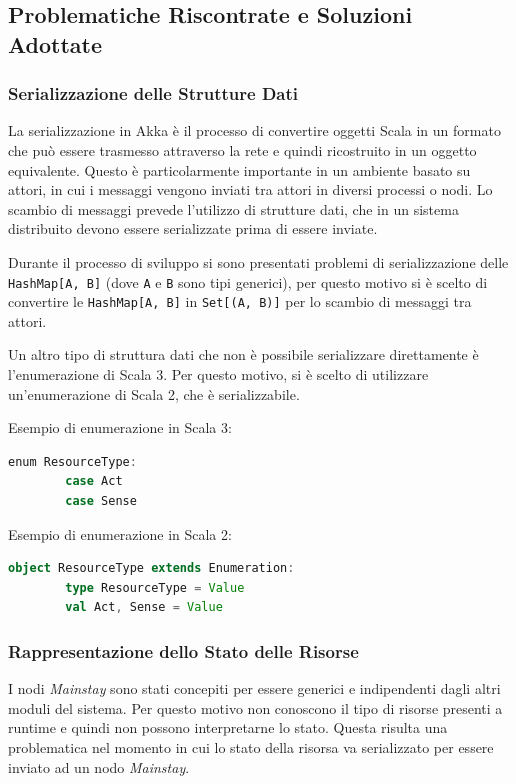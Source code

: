 \documentclass{scrartcl}
\begin{document}
\subsection{Problematiche Riscontrate e Soluzioni Adottate}

\subsubsection{Serializzazione delle Strutture Dati}

La serializzazione in Akka è il processo di convertire oggetti Scala in un formato che può essere trasmesso attraverso la rete e quindi ricostruito in un oggetto equivalente. Questo è particolarmente importante in un ambiente basato su attori, in cui i messaggi vengono inviati tra attori in diversi processi o nodi. Lo scambio di messaggi prevede l'utilizzo di strutture dati, che in un sistema distribuito devono essere serializzate prima di essere inviate.

Durante il processo di sviluppo si sono presentati problemi di serializzazione delle \verb|HashMap[A, B]| (dove \verb|A| e \verb|B| sono tipi generici), per questo motivo si è scelto di convertire le \verb|HashMap[A, B]| in \verb|Set[(A, B)]| per lo scambio di messaggi tra attori.

Un altro tipo di struttura dati che non è possibile serializzare direttamente è l'enumerazione di Scala 3. Per questo motivo, si è scelto di utilizzare un'enumerazione di Scala 2, che è serializzabile.

Esempio di enumerazione in Scala 3:

\begin{lstlisting}[language=Scala]
    enum ResourceType:
        case Act
        case Sense
\end{lstlisting}

Esempio di enumerazione in Scala 2:

\begin{lstlisting}[language=Scala]
    object ResourceType extends Enumeration:
        type ResourceType = Value
        val Act, Sense = Value
\end{lstlisting}

\subsubsection{Rappresentazione dello Stato delle Risorse}

I nodi \textit{Mainstay} sono stati concepiti per essere generici e indipendenti dagli altri moduli del sistema. Per questo motivo non conoscono il tipo di risorse presenti a runtime e quindi non possono interpretarne lo stato. Questa risulta una problematica nel momento in cui lo stato della risorsa va serializzato per essere inviato ad un nodo \textit{Mainstay}.
\end{document}

